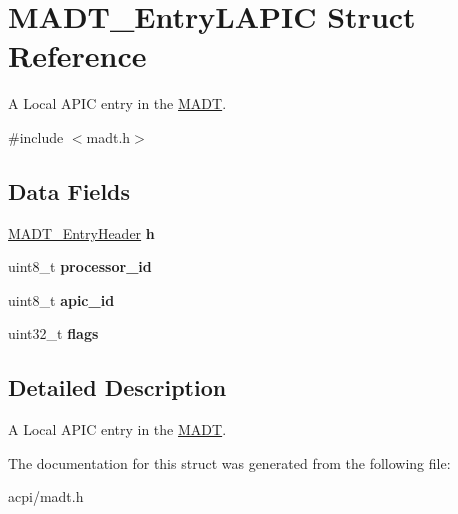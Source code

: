 \hypertarget{structMADT__EntryLAPIC}{}\section{M\+A\+D\+T\+\_\+\+Entry\+L\+A\+P\+IC Struct Reference}
\label{structMADT__EntryLAPIC}


A Local A\+P\+IC entry in the \hyperlink{structMADT}{M\+A\+DT}.  




{\ttfamily \#include $<$madt.\+h$>$}

\subsection*{Data Fields}
\begin{DoxyCompactItemize}
\item 
\hyperlink{structMADT__EntryHeader}{M\+A\+D\+T\+\_\+\+Entry\+Header} {\bfseries h}\hypertarget{structMADT__EntryLAPIC_aa9298b447c91f25bbe89aeb70cb8f168}{}\label{structMADT__EntryLAPIC_aa9298b447c91f25bbe89aeb70cb8f168}

\item 
uint8\+\_\+t {\bfseries processor\+\_\+id}\hypertarget{structMADT__EntryLAPIC_acc0e361ed02b58b4c20f3dfc4c418b5e}{}\label{structMADT__EntryLAPIC_acc0e361ed02b58b4c20f3dfc4c418b5e}

\item 
uint8\+\_\+t {\bfseries apic\+\_\+id}\hypertarget{structMADT__EntryLAPIC_a6bef8c2d41266a0d233e9c35d631b8bf}{}\label{structMADT__EntryLAPIC_a6bef8c2d41266a0d233e9c35d631b8bf}

\item 
uint32\+\_\+t {\bfseries flags}\hypertarget{structMADT__EntryLAPIC_adc33c0fb616737341b07613746005b27}{}\label{structMADT__EntryLAPIC_adc33c0fb616737341b07613746005b27}

\end{DoxyCompactItemize}


\subsection{Detailed Description}
A Local A\+P\+IC entry in the \hyperlink{structMADT}{M\+A\+DT}. 

The documentation for this struct was generated from the following file\+:\begin{DoxyCompactItemize}
\item 
acpi/madt.\+h\end{DoxyCompactItemize}
